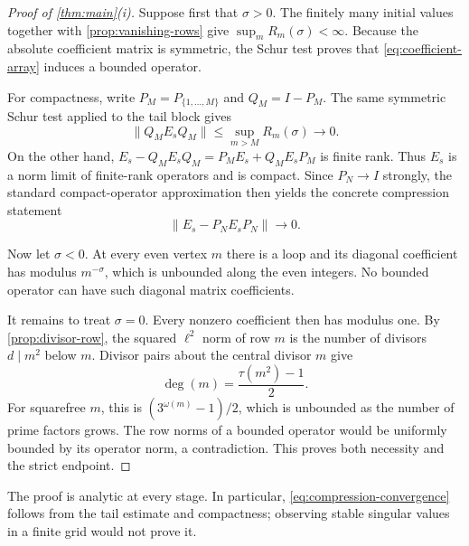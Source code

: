 \begin{proof}[Proof of \cref{thm:main}\textup{(i)}]
Suppose first that $\sigma>0$.  The finitely many initial values together
with \cref{prop:vanishing-rows} give
$\sup_m R_m(\sigma)<\infty$.  Because the absolute coefficient matrix is
symmetric, the Schur test proves that \eqref{eq:coefficient-array} induces
a bounded operator.

For compactness, write $P_M=P_{\{1,\ldots,M\}}$ and $Q_M=I-P_M$.
The same symmetric Schur test applied to the tail block gives
\begin{equation}
 \|Q_M E_s Q_M\|
 \leq \sup_{m>M}R_m(\sigma)\longrightarrow0.
 \label{eq:tail-schur}
\end{equation}
On the other hand,
$E_s-Q_M E_sQ_M=P_M E_s+Q_M E_sP_M$ is finite rank.  Thus $E_s$ is a norm
limit of finite-rank operators and is compact.  Since $P_N\to I$ strongly,
the standard compact-operator approximation then yields the concrete
compression statement
\begin{equation}
 \|E_s-P_NE_sP_N\|\longrightarrow0.
 \label{eq:compression-convergence}
\end{equation}

Now let $\sigma<0$.  At every even vertex $m$ there is a loop and its
diagonal coefficient has modulus $m^{-\sigma}$, which is unbounded along
the even integers.  No bounded operator can have such diagonal matrix
coefficients.

It remains to treat $\sigma=0$.  Every nonzero coefficient then has modulus
one.  By \cref{prop:divisor-row}, the squared $\ell^2$ norm of row $m$ is
the number of divisors $d\mid m^2$ below $m$.  Divisor pairs about the
central divisor $m$ give
\begin{equation}
 \deg(m)=\frac{\tau(m^2)-1}{2}.
 \label{eq:degree-formula}
\end{equation}
For squarefree $m$, this is $(3^{\omega(m)}-1)/2$, which is unbounded as
the number of prime factors grows.  The row norms of a bounded operator
would be uniformly bounded by its operator norm, a contradiction.  This
proves both necessity and the strict endpoint.
\end{proof}

The proof is analytic at every stage.  In particular,
\eqref{eq:compression-convergence} follows from the tail estimate and
compactness; observing stable singular values in a finite grid would not
prove it.
